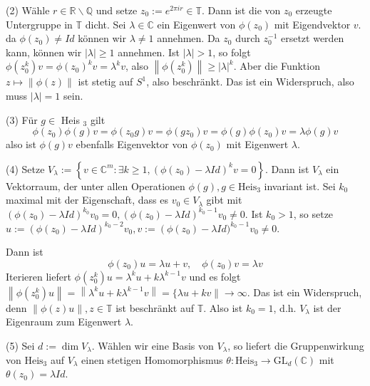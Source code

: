 \documentclass[10pt, letterpaper]{article}
\begin{document}
(2) Wähle $r \in \mathbb{R} \backslash \mathbb{Q}$ und setze $z_{0}:=e^{2 \pi i r} \in \mathbb{T}$. Dann ist die von $z_{0}$ erzeugte Untergruppe in $\mathbb{T}$ dicht. Sei $\lambda \in \mathbb{C}$ ein Eigenwert von $\phi\left(z_{0}\right)$ mit Eigendvektor $v$. da $\phi\left(z_{0}\right) \neq I d$ können wir $\lambda \neq 1$ annehmen. Da $z_{0}$ durch $z_{0}^{-1}$ ersetzt werden kann, können wir $|\lambda| \geq 1$ annehmen. Ist $|\lambda|>1$, so folgt $\phi\left(z_{0}^{k}\right) v=\phi\left(z_{0}\right)^{k} v=\lambda^{k} v$, also $\left\|\phi\left(z_{0}^{k}\right)\right\| \geq|\lambda|^{k}$. Aber die Funktion $z \mapsto\|\phi(z)\|$ ist stetig auf $S^{1}$, also beschränkt. Das ist ein Widerspruch, also muss $|\lambda|=1$ sein.

(3) Für $g \in$ Heis $_{3}$ gilt
$$
\phi\left(z_{0}\right) \phi(g) v=\phi\left(z_{0} g\right) v=\phi\left(g z_{0}\right) v=\phi(g) \phi\left(z_{0}\right) v=\lambda \phi(g) v
$$
also ist $\phi(g) v$ ebenfalls Eigenvektor von $\phi\left(z_{0}\right)$ mit Eigenwert $\lambda$.


(4) Setze $V_{\lambda}:=\left\{v \in \mathbb{C}^{m}: \exists k \geq 1,\left(\phi\left(z_{0}\right)-\lambda I d\right)^{k} v=0\right\}$. Dann ist $V_{\lambda}$ ein Vektorraum, der unter allen Operationen $\phi(g), g \in \mathrm{Heis}_{3}$ invariant ist. Sei $k_{0}$ maximal mit der Eigenschaft, dass es $v_{0} \in V_{\lambda}$ gibt mit $\left(\phi\left(z_{0}\right)-\lambda I d\right)^{k_{0}} v_{0}=0,\left(\phi\left(z_{0}\right)-\lambda I d\right)^{k_{0}-1} v_{0} \neq 0$. Ist $k_{0}>1$, so setze $u:=\left(\phi\left(z_{0}\right)-\lambda I d\right)^{k_{0}-2} v_{0}, v:=\left(\phi\left(z_{0}\right)-\right. \lambda I d)^{k_{0}-1} v_{0} \neq 0$.

Dann ist
$$
\phi\left(z_{0}\right) u=\lambda u+v, \quad \phi\left(z_{0}\right) v=\lambda v
$$
Iterieren liefert $\phi\left(z_{0}^{k}\right) u=\lambda^{k} u+k \lambda^{k-1} v$ und es folgt $\left\|\phi\left(z_{0}^{k}\right) u\right\|= \left\|\lambda^{k} u+k \lambda^{k-1} v\right\|=\{\lambda u+k v \| \rightarrow \infty$. Das ist ein Widerspruch, denn $\|\phi(z) u\|, z \in \mathbb{T}$ ist beschränkt auf $\mathbb{T}$. Also ist $k_{0}=1$, d.h. $V_{\lambda}$ ist der Eigenraum zum Eigenwert $\lambda$.


(5) Sei $d:=\operatorname{dim} V_{\lambda}$. Wählen wir eine Basis von $V_{\lambda}$, so liefert die Gruppenwirkung von $\mathrm{Heis}_{3}$ auf $V_{\lambda}$ einen stetigen Homomorphismus $\theta: \mathrm{Heis}_{3} \rightarrow \mathrm{GL}_{d}(\mathbb{C})$ mit $\theta\left(z_{0}\right)=\lambda I d$.
\end{document}
